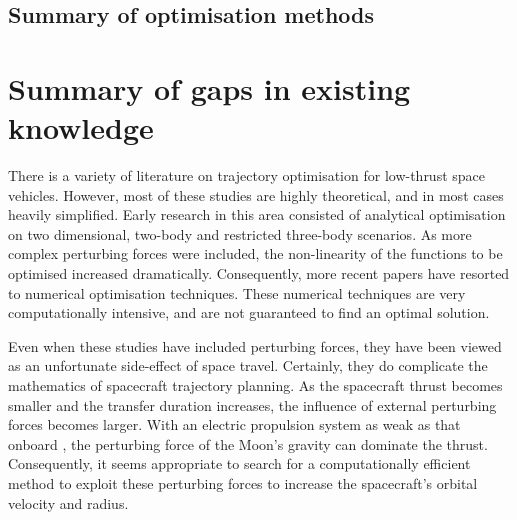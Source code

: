 \subsection{Summary of optimisation methods}


\section{Summary of gaps in existing knowledge}

There is a variety of literature on trajectory optimisation for low-thrust space vehicles. However, most of these studies are highly theoretical, and in most cases heavily simplified. Early research in this area consisted of analytical optimisation on two dimensional, two-body and restricted three-body scenarios. As more complex perturbing forces were included, the non-linearity of the functions to be optimised increased dramatically. Consequently, more recent papers have resorted to numerical optimisation techniques. These numerical techniques are very computationally intensive, and are not guaranteed to find an optimal solution.

Even when these studies have included perturbing forces, they have been viewed as an unfortunate side-effect of space travel. Certainly, they do complicate the mathematics of spacecraft trajectory planning. As the spacecraft thrust becomes smaller and the transfer duration increases, the influence of external perturbing forces becomes larger. With an electric propulsion system as weak as that onboard \BW, the perturbing force of the Moon's gravity can dominate the thrust. Consequently, it seems appropriate to search for a computationally efficient method to exploit these perturbing forces to increase the spacecraft's orbital velocity and radius.